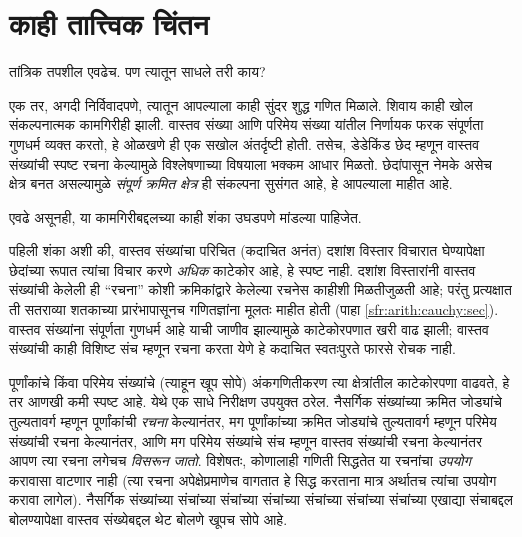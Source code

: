 \documentclass[11pt,a4paper,openany]{book}
\theoremstyle{definition}
\begin{document}
\section{काही तात्त्विक चिंतन}\label{sfr:arith:ref:sec}

तांत्रिक तपशील एवढेच. पण त्यातून साधले तरी काय?

एक तर, अगदी निर्विवादपणे, त्यातून आपल्याला काही {सुंदर} शुद्ध गणित
मिळाले. शिवाय काही खोल संकल्पनात्मक कामगिरीही झाली. वास्तव संख्या आणि
परिमेय संख्या यांतील निर्णायक फरक संपूर्णता गुणधर्म व्यक्त करतो, हे
ओळखणे ही एक सखोल अंतर्दृष्टी होती. तसेच, डेडेकिंड छेद म्हणून वास्तव
संख्यांची स्पष्ट रचना केल्यामुळे विश्लेषणाच्या विषयाला भक्कम आधार मिळतो.
छेदांपासून नेमके असेच क्षेत्र बनत असल्यामुळे \emph{संपूर्ण क्रमित क्षेत्र}
ही संकल्पना सुसंगत आहे, हे आपल्याला माहीत आहे.

एवढे असूनही, या कामगिरीबद्दलच्या काही शंका उघडपणे मांडल्या पाहिजेत.

पहिली शंका अशी की, वास्तव संख्यांचा परिचित (कदाचित अनंत) दशांश विस्तार
विचारात घेण्यापेक्षा छेदांच्या रूपात त्यांचा विचार करणे \emph{अधिक}
काटेकोर आहे, हे स्पष्ट नाही. दशांश विस्तारांनी वास्तव संख्यांची केलेली
ही ``रचना'' कोशी क्रमिकांद्वारे केलेल्या रचनेस काहीशी मिळतीजुळती आहे;
परंतु प्रत्यक्षात ती सतराव्या शतकाच्या प्रारंभापासूनच गणितज्ञांना मूलतः
माहीत होती (पाहा \ref{sfr:arith:cauchy:sec}). वास्तव संख्यांना संपूर्णता गुणधर्म
आहे याची जाणीव झाल्यामुळे काटेकोरपणात खरी वाढ झाली; वास्तव संख्यांची काही
विशिष्ट संच म्हणून रचना करता येणे हे कदाचित स्वतःपुरते फारसे रोचक नाही.

पूर्णांकांचे किंवा परिमेय संख्यांचे (त्याहून खूप सोपे) अंकगणितीकरण त्या
क्षेत्रांतील काटेकोरपणा वाढवते, हे तर आणखी कमी स्पष्ट आहे. येथे एक साधे
निरीक्षण उपयुक्त ठरेल. नैसर्गिक संख्यांच्या क्रमित जोड्यांचे तुल्यतावर्ग
म्हणून पूर्णांकांची \emph{रचना} केल्यानंतर, मग पूर्णांकांच्या क्रमित
जोड्यांचे तुल्यतावर्ग म्हणून परिमेय संख्यांची रचना केल्यानंतर, आणि मग
परिमेय संख्यांचे संच म्हणून वास्तव संख्यांची रचना केल्यानंतर आपण त्या
रचना लगेचच \emph{विसरून जातो}. विशेषतः, कोणालाही गणिती सिद्धतेत या
रचनांचा \emph{उपयोग} करावासा वाटणार नाही (त्या रचना अपेक्षेप्रमाणेच
वागतात हे सिद्ध करताना मात्र अर्थातच त्यांचा उपयोग करावा लागेल).
नैसर्गिक संख्यांच्या संचांच्या संचांच्या संचांच्या संचांच्या संचांच्या
संचांच्या एखाद्या संचाबद्दल बोलण्यापेक्षा वास्तव संख्येबद्दल थेट बोलणे
खूपच सोपे आहे.
\end{document}

